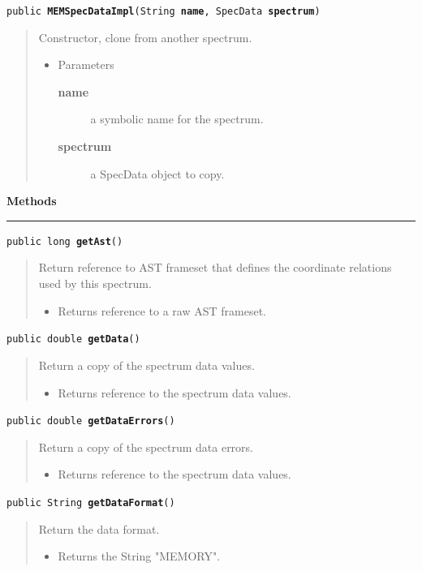 \documentclass[twoside,11pt]{article}
\renewcommand{\_}{\texttt{\symbol{95}}}
\newcommand{\method}[1]{\texttt{#1}}
\newenvironment{desc}{\begin{quote}}{\end{quote}}
\newcommand{\methods}{
   \par\textbf{\large{Methods}}\\
   \hrule
}
\begin{document}
\method{public \textbf{MEMSpecDataImpl}(\texttt{String} \textbf{name}, \texttt{SpecData} \textbf{spectrum})\label{l5}\label{l6}}
\begin{desc}Constructor, clone from another spectrum.
\begin{itemize}
\item{Parameters
  \begin{description}
   \item[\textbf{name}]{a symbolic name for the spectrum.}
   \item[\textbf{spectrum}]{a SpecData object to copy.}
  \end{description}}
\end{itemize}
\end{desc}

\methods
\method{public long \textbf{getAst}()\label{l7}\label{l8}}
\begin{desc}Return reference to AST frameset that defines the coordinate
 relations used by this spectrum.
\begin{itemize}
\item{Returns reference to a raw AST frameset. }
\end{itemize}
\end{desc}

\method{public double \textbf{getData}()\label{l9}\label{l10}}
\begin{desc}Return a copy of the spectrum data values.
\begin{itemize}
\item{Returns reference to the spectrum data values. }
\end{itemize}
\end{desc}

\method{public double \textbf{getDataErrors}()\label{l11}\label{l12}}
\begin{desc}Return a copy of the spectrum data errors.
\begin{itemize}
\item{Returns reference to the spectrum data values. }
\end{itemize}
\end{desc}

\method{public String \textbf{getDataFormat}()\label{l13}\label{l14}}
\begin{desc}Return the data format.
\begin{itemize}
\item{Returns the String "MEMORY". }
\end{itemize}
\end{desc}
\end{document}
